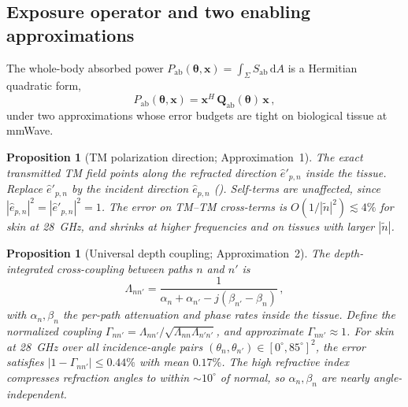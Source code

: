 \documentclass[journal,twocolumn,10pt]{IEEEtran}
\theoremstyle{plain}
\newtheorem{proposition}[theorem]{Proposition}
\theoremstyle{definition}
\theoremstyle{remark}
\newcommand{\xx}{\mathbf{x}}
\newcommand{\Sab}{S_{\mathrm{ab}}}
\newcommand{\Pabs}{P_{\mathrm{ab}}}
\newcommand{\Qabs}{\mathbf{Q}_{\mathrm{ab}}}
\newcommand{\thetab}{\bm{\theta}}
\newcommand{\ntilde}{\tilde{n}}
\begin{document}
\subsection{Exposure operator and two enabling approximations}

The whole-body absorbed power
$\Pabs(\thetab,\xx) = \int_{\Sigma}\Sab\,\mathrm{d}A$ is a Hermitian
quadratic form,
\begin{equation}\label{eq:Qabs}
  \Pabs(\thetab,\xx) = \xx^{H}\,\Qabs(\thetab)\,\xx\,,
\end{equation}
under two approximations whose error budgets are tight on
biological tissue at mmWave.

\begin{proposition}[TM polarization direction; Approximation~1]\label{prop:approx1}
The exact transmitted TM field points along the refracted direction
$\hat{e}'_{p,n}$ inside the tissue. Replace $\hat{e}'_{p,n}$ by the
incident direction $\hat{e}_{p,n}$ (). Self-terms
are unaffected, since $|\hat{e}_{p,n}|^2 = |\hat{e}'_{p,n}|^2 = 1$.
The error on TM--TM cross-terms is $O(1/|\ntilde|^2) \lesssim 4\%$
for skin at 28~GHz, and shrinks at higher frequencies and
on tissues with larger $|\ntilde|$.
\end{proposition}

\begin{proposition}[Universal depth coupling; Approximation~2]\label{prop:approx2}
The depth-integrated cross-coupling between paths $n$ and $n'$ is
\begin{equation}\label{eq:Lambda}
  \Lambda_{nn'} = \frac{1}{\alpha_n + \alpha_{n'}
  - j(\beta_{n'} - \beta_n)}\,,
\end{equation}
with $\alpha_n, \beta_n$ the per-path attenuation and phase rates
inside the tissue. Define the normalized coupling
$\Gamma_{nn'} = \Lambda_{nn'} / \sqrt{\Lambda_{nn}\Lambda_{n'n'}}$,
and approximate $\Gamma_{nn'} \approx 1$. For skin at
28~GHz over all incidence-angle pairs
$(\theta_n,\theta_{n'}) \in [0^{\circ},85^{\circ}]^2$, the error
satisfies $|1 - \Gamma_{nn'}| \leq 0.44\%$ with mean $0.17\%$.
The high refractive index compresses refraction angles to within
$\sim\!10^{\circ}$ of normal, so $\alpha_n,\beta_n$ are nearly
angle-independent.
\end{proposition}
\end{document}

